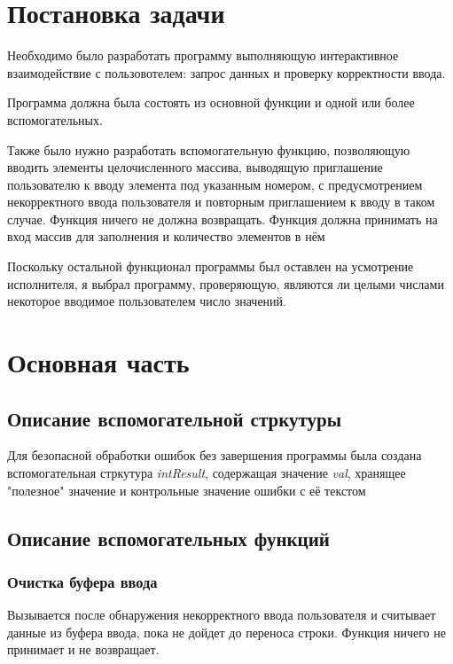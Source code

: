 \documentclass[a4paper, 12pt]{article}
\begin{document}
\cleardoublepage
\section*{Постановка задачи}
Необходимо было разработать программу выполняющую интерактивное взаимодействие 
с пользовотелем: запрос данных и проверку корректности ввода.

Программа должна была состоять из основной функции и одной или более вспомогательных.

Также было нужно разработать вспомогательную функцию, позволяющую вводить элементы 
целочисленного массива, выводящую приглашение пользователю к вводу элемента под указанным
номером, с предусмотрением некорректного ввода пользователя и повторным приглашением
к вводу в таком случае. Функция ничего не должна возвращать. Функция должна принимать на вход
массив для заполнения и количество элементов в нём

Поскольку остальной функционал программы был оставлен на усмотрение исполнителя, 
я выбрал программу, проверяющую, являются ли целыми числами некоторое вводимое
пользователем число значений.
\cleardoublepage



\section*{Основная часть}

\subsection{Описание вспомогательной стркутуры}
Для безопасной обработки ошибок без завершения программы была создана вспомогательная
стркутура \textit{intResult}, содержащая значение \textit{val}, хранящее "полезное" значение
и контрольные значение ошибки с её текстом

\subsection{Описание вспомогательных функций}
\subsubsection{Очистка буфера ввода}
Вызывается после обнаружения некорректного ввода пользователя
и считывает данные из буфера ввода, пока не дойдет до переноса строки. Функция
ничего не принимает и не возвращает.
\end{document}
